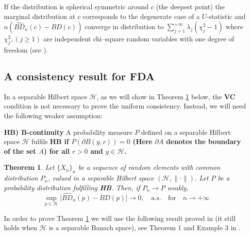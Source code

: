 \documentclass[a4paper]{article}
\numberwithin{equation}{section}
\newtheorem{theorem}{Theorem}[section]
\begin{document}
If the distribution is spherical symmetric around  $c$ (the deepest point) the marginal distribution at $c$ corresponds to the degenerate case of a $U$-statistic and $n\left(\widehat{BD}_n(c) -BD(c) \right)$ converge in distribution to $\sum_{j=1}^{+\infty} \lambda_j (\chi^2_{j} -1)$ where $\chi^2_{j}, (j \geq 1)$ are independent chi--square random variables with one degree of freedom (see \cite{serfling2000}).
  
\subsection{\textbf{A consistency result for FDA}} \label{fda}
In a separable Hilbert space $\mathcal{H}$, as we will show in  Theorem  \ref{hilb} below,  the \textbf{VC} condition is not necessary to prove the uniform consistency. Instead, we will need the following weaker assumption:

\textbf{HB) B-continuity} A probability measure $P$ defined on a separable Hilbert space $\mathcal{H}$ fulfils \bf HB \rm if $P(\partial B(y,r))=0$ (Here $\partial A$ denotes the boundary of the set $A$) for all $r>0$ and $y\in \mathcal{H}$.







\begin{theorem}
\label{hilb}
 Let $\{X_n\}_n$ be a sequence of random elements with common distribution $P_n$, valued in a separable Hilbert space $(\mathcal{H},\|\cdot\|)$.  Let $P$ be a probability distribution fulfilling \textbf{HB}. Then, if   $P_n\rightarrow P$ weakly,
$$\sup_{p \in \mathcal{H}}  \vert \widehat{BD}_n(p) - BD(p) \vert \rightarrow 0, \quad \textrm{a.s.} \quad \textrm{for} \quad n \rightarrow + \infty$$
\end{theorem} 
In order to prove Theorem  \ref{hilb} we will use the following  result proved in \cite{billingsley1967} (it still holds when $\mathcal{H}$ is a separable Banach space), see Theorem 1 and Example 3  in \cite{billingsley1967}. \\

 
\end{document}
